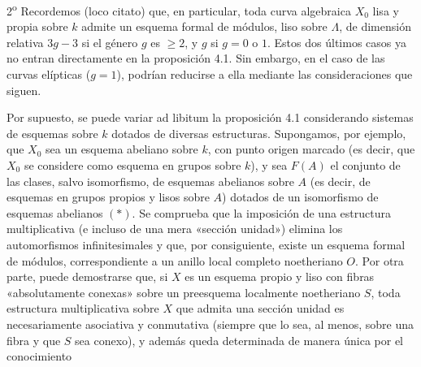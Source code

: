 \documentclass[11pt,twoside,openany]{book}
\numberwithin{equation}{section}
\theoremstyle{plain}
\theoremstyle{definition}
\theoremstyle{remark}
\theoremstyle{plain}
\theoremstyle{definition}
\theoremstyle{remark}
\begin{document}
2\textsuperscript{o} Recordemos (loco citato) que, en particular, toda curva
algebraica $X_0$ lisa y propia sobre $k$ admite un esquema formal de módulos,
liso sobre $\Lambda$, de dimensión relativa $3g-3$ si el género $g$ es
$\geq2$, y $g$ si $g=0$ o $1$. Estos dos últimos casos ya no entran directamente
en la proposición 4.1. Sin embargo, en el caso de las curvas elípticas
($g=1$), podrían reducirse a ella mediante las consideraciones que siguen.

Por supuesto, se puede variar ad libitum la proposición 4.1 considerando
sistemas de esquemas sobre $k$ dotados de diversas estructuras. Supongamos,
por ejemplo, que $X_0$ sea un esquema abeliano sobre $k$, con punto origen
marcado (es decir, que $X_0$ se considere como esquema en grupos sobre $k$), y
sea $F(A)$ el conjunto de las clases, salvo isomorfismo, de esquemas abelianos
sobre $A$ (es decir, de esquemas en grupos propios y lisos sobre $A$) dotados
de un isomorfismo de esquemas abelianos $(*)$. Se comprueba que la imposición
de una estructura multiplicativa (e incluso de una mera «sección unidad»)
elimina los automorfismos infinitesimales y que, por consiguiente, existe un
esquema formal de módulos, correspondiente a un anillo local completo
noetheriano $O$. Por otra parte, puede demostrarse que, si $X$ es un esquema
propio y liso con fibras «absolutamente conexas» sobre un preesquema localmente
noetheriano $S$, toda estructura multiplicativa sobre $X$ que admita una
sección unidad es necesariamente asociativa y conmutativa (siempre que lo sea,
al menos, sobre una fibra y que $S$ sea conexo), y además queda determinada de
manera única por el conocimiento
\end{document}
